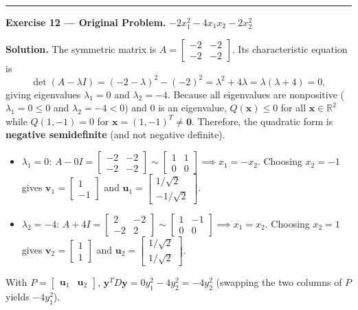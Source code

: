 \documentclass[11pt, letterpaper]{article}
\theoremstyle{definition}
\theoremstyle{remark}
\newcommand{\R}{\mathbb{R}}
\begin{document}
\medskip
\hrule
\medskip

\textbf{Exercise 12 --- Original Problem.} $-2x_1^2 - 4x_1x_2 - 2x_2^2$

\textbf{Solution.}
The symmetric matrix is $A = \begin{bmatrix} -2 & -2 \\ -2 & -2 \end{bmatrix}$. Its characteristic equation is
\[
\det(A - \lambda I) = (-2 - \lambda)^2 - (-2)^2 = \lambda^2 + 4\lambda = \lambda(\lambda + 4) = 0,
\]
giving eigenvalues $\lambda_1 = 0$ and $\lambda_2 = -4$. Because all eigenvalues are nonpositive ($\lambda_1 = 0 \le 0$ and $\lambda_2 = -4 < 0$) and $0$ is an eigenvalue, $Q(\mathbf{x}) \le 0$ for all $\mathbf{x} \in \R^2$ while $Q(1, -1) = 0$ for $\mathbf{x} = (1, -1)^T \neq \mathbf{0}$. Therefore, the quadratic form is \textbf{negative semidefinite} (and not negative definite).
\begin{itemize}
    \item $\lambda_1 = 0$: $A - 0I = \begin{bmatrix} -2 & -2 \\ -2 & -2 \end{bmatrix} \sim \begin{bmatrix} 1 & 1 \\ 0 & 0 \end{bmatrix} \implies x_1 = -x_2$. Choosing $x_2 = -1$ gives $\mathbf{v}_1 = \begin{bmatrix} 1 \\ -1 \end{bmatrix}$ and $\mathbf{u}_1 = \begin{bmatrix} 1/\sqrt{2} \\ -1/\sqrt{2} \end{bmatrix}$.
    \item $\lambda_2 = -4$: $A + 4I = \begin{bmatrix} 2 & -2 \\ -2 & 2 \end{bmatrix} \sim \begin{bmatrix} 1 & -1 \\ 0 & 0 \end{bmatrix} \implies x_1 = x_2$. Choosing $x_2 = 1$ gives $\mathbf{v}_2 = \begin{bmatrix} 1 \\ 1 \end{bmatrix}$ and $\mathbf{u}_2 = \begin{bmatrix} 1/\sqrt{2} \\ 1/\sqrt{2} \end{bmatrix}$.
\end{itemize}
With $P = \begin{bmatrix} \mathbf{u}_1 & \mathbf{u}_2 \end{bmatrix}$, $\mathbf{y}^T D \mathbf{y} = 0y_1^2 - 4y_2^2 = -4y_2^2$ (swapping the two columns of $P$ yields $-4y_1^2$).
\end{document}
